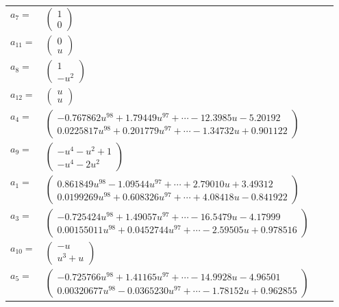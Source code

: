 \documentclass[1p]{elsarticle_modified}
\theoremstyle{definition}
\begin{document}
\begin{tabular}{m{7pt} m{180pt} m{7pt} m{180pt} }
\flushright $a_{7}=$&$\begin{pmatrix}1\\0\end{pmatrix}$ \\
\flushright $a_{11}=$&$\begin{pmatrix}0\\u\end{pmatrix}$ \\
\flushright $a_{8}=$&$\begin{pmatrix}1\\- u^2\end{pmatrix}$ \\
\flushright $a_{12}=$&$\begin{pmatrix}u\\u\end{pmatrix}$ \\
\flushright $a_{4}=$&$\begin{pmatrix}-0.767862 u^{98}+1.79449 u^{97}+\cdots-12.3985 u-5.20192\\0.0225817 u^{98}+0.201779 u^{97}+\cdots-1.34732 u+0.901122\end{pmatrix}$ \\
\flushright $a_{9}=$&$\begin{pmatrix}- u^4- u^2+1\\- u^4-2 u^2\end{pmatrix}$ \\
\flushright $a_{1}=$&$\begin{pmatrix}0.861849 u^{98}-1.09544 u^{97}+\cdots+2.79010 u+3.49312\\0.0199269 u^{98}+0.608326 u^{97}+\cdots+4.08418 u-0.841922\end{pmatrix}$ \\
\flushright $a_{3}=$&$\begin{pmatrix}-0.725424 u^{98}+1.49057 u^{97}+\cdots-16.5479 u-4.17999\\0.00155011 u^{98}+0.0452744 u^{97}+\cdots-2.59505 u+0.978516\end{pmatrix}$ \\
\flushright $a_{10}=$&$\begin{pmatrix}- u\\u^3+u\end{pmatrix}$ \\
\flushright $a_{5}=$&$\begin{pmatrix}-0.725766 u^{98}+1.41165 u^{97}+\cdots-14.9928 u-4.96501\\0.00320677 u^{98}-0.0365230 u^{97}+\cdots-1.78152 u+0.962855\end{pmatrix}$ \\

\end{tabular}
\end{document}
